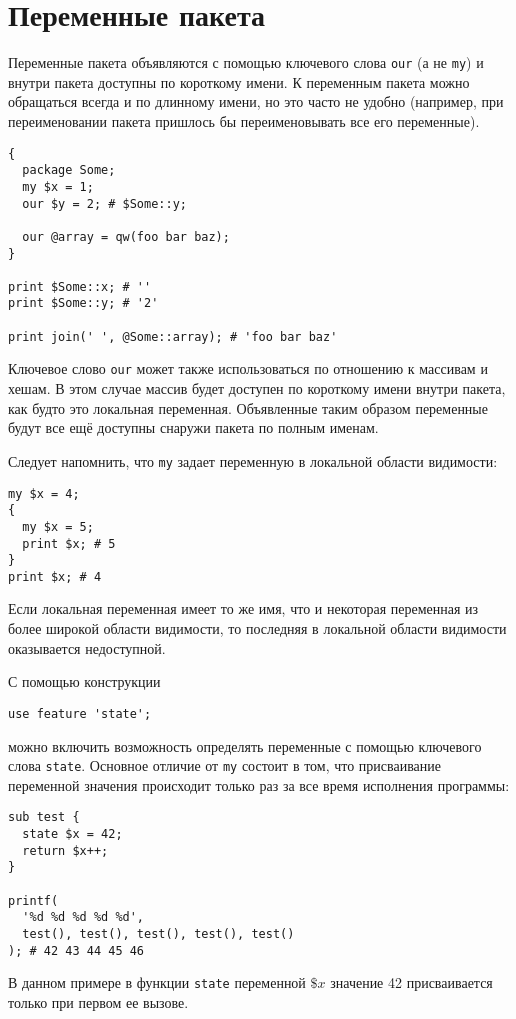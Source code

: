 \section{Переменные пакета}
Переменные пакета объявляются с помощью ключевого слова \verb|our| (а не \verb|my|) и внутри пакета доступны по короткому имени. К переменным пакета можно обращаться всегда и по длинному имени, но это часто не удобно (например, при переименовании пакета пришлось бы переименовывать все его переменные).
\begin{verbatim}
{
  package Some;
  my $x = 1;
  our $y = 2; # $Some::y;

  our @array = qw(foo bar baz);
}

print $Some::x; # ''
print $Some::y; # '2'

print join(' ', @Some::array); # 'foo bar baz'
\end{verbatim}
Ключевое слово \verb|our| может также использоваться по отношению к массивам и хешам. В этом случае массив будет доступен по короткому имени внутри пакета, как будто это локальная переменная. Объявленные таким образом переменные будут все ещё доступны снаружи пакета по полным именам.

Следует напомнить, что \verb|my| задает переменную в локальной области видимости:
\begin{verbatim}
my $x = 4;
{
  my $x = 5;
  print $x; # 5
}
print $x; # 4
\end{verbatim}
Если локальная переменная имеет то же имя, что и некоторая переменная из более широкой области видимости, то последняя в локальной области видимости оказывается недоступной.

С помощью конструкции
\begin{verbatim}
use feature 'state';
\end{verbatim}
можно включить возможность определять переменные с помощью ключевого слова \verb|state|. Основное отличие от \verb|my| состоит в том, что присваивание переменной значения происходит только раз за все время исполнения программы:
\begin{verbatim}
sub test {
  state $x = 42;
  return $x++;
}

printf(
  '%d %d %d %d %d',
  test(), test(), test(), test(), test()
); # 42 43 44 45 46
\end{verbatim}
В данном примере в функции \verb|state| переменной $\$x$ значение 42 присваивается только при первом ее вызове.

